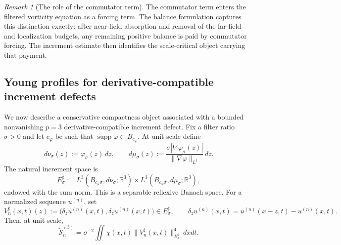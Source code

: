 \documentclass[11pt]{article}
\numberwithin{equation}{section}
\theoremstyle{plain}
\theoremstyle{definition}
\theoremstyle{remark}
\newtheorem{remark}[theorem]{Remark}
\DeclareMathOperator{\supp}{supp}
\newcommand{\R}{\mathbb R}
\begin{document}
\begin{remark}[The role of the commutator term]\label{rem:balance-not-pointwise-stretching}
The commutator term enters the filtered vorticity equation as a forcing term.  The balance formulation captures this distinction exactly: after near-field absorption and removal of the far-field and localization budgets, any remaining positive balance is paid by commutator forcing.  The increment estimate then identifies the scale-critical object carrying that payment.
\end{remark}



\subsection{Young profiles for derivative-compatible increment defects}

We now describe a conservative compactness object associated with a bounded nonvanishing $p=3$ derivative-compatible increment defect.  Fix a filter ratio $\sigma>0$ and let $c_\varphi$ be such that $\supp\varphi\subset B_{c_\varphi}$.  At unit scale define
\[
d\nu_\sigma(z):=\varphi_\sigma(z)\,dz,
\qquad
 d\mu_\sigma(z):=\frac{\sigma|\nabla\varphi_\sigma(z)|}{\|\nabla\varphi\|_{L^1}}\,dz.
\]
The natural increment space is
\begin{equation}\label{eq:Esharp-def}
E^\sharp_\sigma
:=
L^3(B_{c_\varphi\sigma},d\nu_\sigma;\R^3)
\times
L^3(B_{c_\varphi\sigma},d\mu_\sigma;\R^3),
\end{equation}
endowed with the sum norm.  This is a separable reflexive Banach space.  For a normalized sequence $u^{(n)}$, set
\begin{equation}\label{eq:Vsharp-def}
V^\sharp_n(x,t)(z)
:=
\bigl(\delta_z u^{(n)}(x,t),\delta_z u^{(n)}(x,t)\bigr)
\in E^\sharp_\sigma,
\qquad
\delta_z u^{(n)}(x,t)=u^{(n)}(x-z,t)-u^{(n)}(x,t).
\end{equation}
Then, at unit scale,
\begin{equation}\label{eq:S-Vsharp}
\widetilde{\mathcal S}^{(3)}_n
=
\sigma^{-2}\iint\chi(x,t)\|V^\sharp_n(x,t)\|_{E^\sharp_\sigma}^{4}\,dxdt.
\end{equation}
\end{document}
